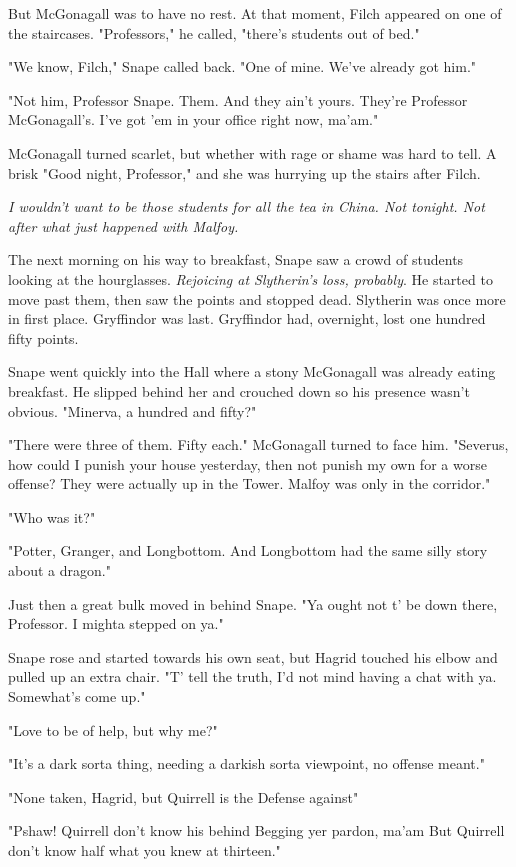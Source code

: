 But McGonagall was to have no rest. At that moment, Filch appeared on one of the staircases. "Professors," he called, "there's students out of bed."

"We know, Filch," Snape called back. "One of mine. We've already got him."

"Not him, Professor Snape. Them. And they ain't yours. They're Professor McGonagall's. I've got 'em in your office right now, ma'am."

McGonagall turned scarlet, but whether with rage or shame was hard to tell. A brisk "Good night, Professor," and she was hurrying up the stairs after Filch.

\emph{I wouldn't want to be those students for all the tea in China. Not tonight. Not after what just happened with Malfoy.}

The next morning on his way to breakfast, Snape saw a crowd of students looking at the hourglasses. \emph{Rejoicing at Slytherin's loss, probably}. He started to move past them, then saw the points and stopped dead. Slytherin was once more in first place. Gryffindor was last. Gryffindor had, overnight, lost one hundred fifty points.

Snape went quickly into the Hall where a stony McGonagall was already eating breakfast. He slipped behind her and crouched down so his presence wasn't obvious. "Minerva, a hundred and fifty?"

"There were three of them. Fifty each." McGonagall turned to face him. "Severus, how could I punish your house yesterday, then not punish my own for a worse offense? They were actually up in the Tower. Malfoy was only in the corridor."

"Who was it?"

"Potter, Granger, and Longbottom. And Longbottom had the same silly story about a dragon."

Just then a great bulk moved in behind Snape. "Ya ought not t' be down there, Professor. I mighta stepped on ya."

Snape rose and started towards his own seat, but Hagrid touched his elbow and pulled up an extra chair. "T' tell the truth, I'd not mind having a chat with ya. Somewhat's come up."

"Love to be of help, but why me?"

"It's a dark sorta thing, needing a darkish sorta viewpoint, no offense meant."

"None taken, Hagrid, but Quirrell is the Defense against{\el}"

"Pshaw! Quirrell don't know his behind{\el} Begging yer pardon, ma'am{\el} But Quirrell don't know half what you knew at thirteen."

